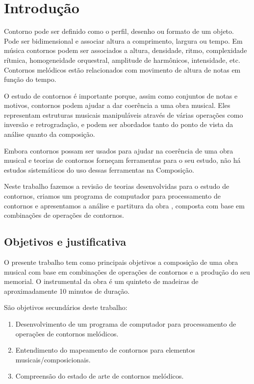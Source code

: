 \chapter{Introdução}
\label{cha:introducao}

Contorno pode ser definido como o perfil, desenho ou formato de um
objeto. Pode ser bidimensional e associar altura a comprimento,
largura ou tempo. Em música contornos podem ser associados a altura,
densidade, ritmo, complexidade rítmica, homogeneidade orquestral,
amplitude de harmônicos, intensidade, etc. Contornos melódicos estão
relacionados com movimento de altura de notas em função do tempo.

O estudo de contornos é importante porque, assim como conjuntos de
notas e motivos, contornos podem ajudar a dar coerência a uma obra
musical. Eles representam estruturas musicais manipuláveis através de
várias operações como inversão e retrogradação, e podem ser abordados
tanto do ponto de vista da análise quanto da composição.


Embora contornos possam ser usados para ajudar na coerência de uma
obra musical e teorias de contornos forneçam ferramentas para o seu
estudo, não há estudos sistemáticos do uso dessas ferramentas na
Composição.

Neste trabalho fazemos a revisão de teorias desenvolvidas para o
estudo de contornos, criamos um programa de computador para
processamento de contornos e apresentamos a análise e partitura da
obra \obra{}, composta com base em combinações de operações de
contornos.

\section{Objetivos e justificativa}
\label{sec:objet-e-just}

O presente trabalho tem como principais objetivos a composição de uma
obra musical com base em combinações de operações de contornos e a
produção do seu memorial. O instrumental da obra é um quinteto de
madeiras de aproximadamente 10 minutos de duração.

São objetivos secundários deste trabalho:

\begin{enumerate}
\item Desenvolvimento de um programa de computador para processamento
  de operações de contornos melódicos.
\item Entendimento do mapeamento de contornos para elementos
  musicais/composicionais.
\item Compreensão do estado de arte de contornos melódicos.
\end{enumerate}

